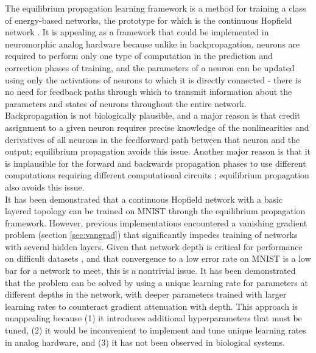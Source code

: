 \documentclass[format=sigconf]{acmart}
\newcommand{\npar}{\\\indent}
\begin{document}
The equilibrium propagation learning framework \cite{scellier17} is a method for training a class of energy-based networks, the prototype for which is the continuous Hopfield network \cite{hopfield1984}. It is appealing as a framework that could be implemented in neuromorphic analog hardware because unlike in backpropagation, neurons are required to perform only one type of computation in the prediction and correction phases of training, and the parameters of a neuron can be updated using only the activations of neurons to which it is directly connected - there is no need for feedback paths through which to transmit information about the parameters and states of neurons throughout the entire network. Backpropagation is not biologically plausible, and a major reason is that credit assignment to a given neuron requires precise knowledge of the nonlinearities and derivatives of all neurons in the feedforward path between that neuron and the output\cite{bengio2015}; equilibrium propagation avoids this issue. Another major reason is that it is implausible for the forward and backwards propagation phases to use different computations requiring different computational circuits \cite{scellier17}; equilibrium propagation also avoids this issue.
\npar
It has been demonstrated \cite{scellier17} that a continuous Hopfield network with a basic layered topology can be trained on MNIST \cite{mnist1998} through the equilibrium propagation framework. However, previous implementations encountered a vanishing gradient problem (section \ref{sec:vangrad}) that significantly impedes training of networks with several hidden layers. Given that network depth is critical for performance on difficult datasets \cite{simonyan2014, srivastava2015tvdn}, and that convergence to a low error rate on MNIST is a low bar for a network to meet, this is a nontrivial issue. It has been demonstrated \cite{scellier17} that the problem can be solved by using a unique learning rate for parameters at different depths in the network, with deeper parameters trained with larger learning rates to counteract gradient attenuation with depth. This approach is unappealing because (1) it introduces additional hyperparameters that must be tuned, (2) it would be inconvenient to implement and tune unique learning rates in analog hardware, and (3) it has not been observed in biological systems.
\npar
\end{document}
